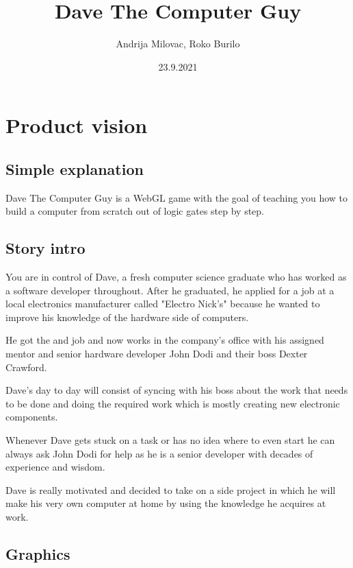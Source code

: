 \documentclass[12pt]{article}
\author{Andrija Milovac, Roko Burilo}
\title{Dave The Computer Guy}
\date{23.9.2021}
\begin{document}
\maketitle
\tableofcontents
\section{Product vision}
\subsection{Simple explanation}
Dave The Computer Guy is a WebGL game with the goal of teaching you how to build a computer from scratch out of logic gates step by step.
\subsection{Story intro}

You are in control of Dave, a fresh computer science graduate who has worked as a software developer throughout.
After he graduated, he applied for a job at a local electronics manufacturer called "Electro Nick's" because he wanted to 
improve his knowledge of the hardware side of computers.

He got the and job and now works in the company's office with his assigned mentor and senior hardware developer John Dodi and their boss Dexter Crawford.

Dave's day to day will consist of syncing with his boss about the work that needs to be done and doing the required work which is mostly
creating new electronic components.

Whenever Dave gets stuck on a task or has no idea where to even start he can always ask John Dodi for help as he is a senior developer with
decades of experience and wisdom.

Dave is really motivated and decided to take on a side project in which he will make his very own computer at home by using the knowledge 
he acquires at work.
\subsection{Graphics}
\end{document}
